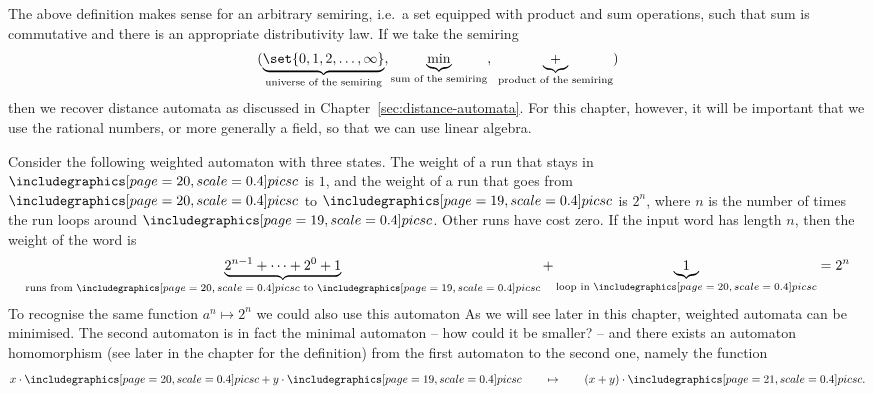 The above definition makes sense for an arbitrary semiring, i.e.~a set equipped with product and sum operations, such that sum is commutative and there is an appropriate distributivity law. If we take the semiring 
\begin{align*}
(\underbrace{\set{0,1,2,\ldots,\infty}}_{\text{universe of the semiring}}, \underbrace{\min}_{\text{sum of the semiring}}, \ \underbrace{+}_{\text{product of the semiring}})	
\end{align*}
then we recover distance automata as discussed in Chapter~\ref{sec:distance-automata}. For this chapter, however, it will be important that we use the rational numbers, or more generally a  field, so that we can use linear algebra.


\begin{example}
Consider the following weighted automaton with three states.
 The weight of a run that stays in $\whiteball$  is  $1$, and the weight of a run that goes from $\whiteball$ to $\blackball$  is $2^n$, where $n$ is the number of times the run loops around $\blackball$. Other runs have cost zero. If the input word has length $n$, then the weight of the word is
\begin{align*}
	\underbrace{2^{n-1} + \cdots +2^{0}+1}_{\text{runs from $\whiteball$ to $\blackball$}} + \underbrace{1}_{\text{loop in $\whiteball$}} = 2^n
\end{align*}
To recognise the same function $a^n \mapsto 2^n$ we could also use this automaton
As we will see later in this chapter, weighted automata can be minimised. The second automaton is in fact the minimal automaton -- how could it be smaller? -- and there exists an automaton homomorphism  (see later in the chapter for the definition) from  the first automaton to the second one, namely the function
\begin{align*}
  x \cdot \whiteball + y \cdot \blackball \qquad \mapsto \qquad (x+y) \cdot \blueball.
\end{align*}



\end{example}
